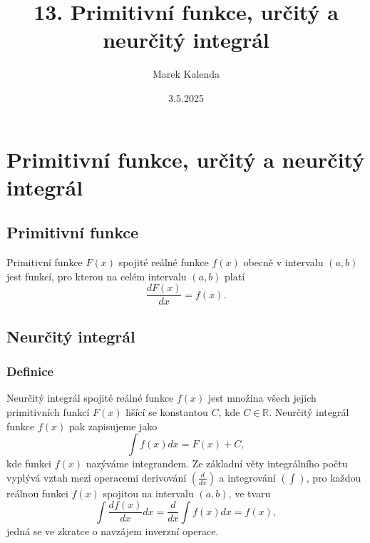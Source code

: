 \title{13. Primitivní funkce, určitý a neurčitý integrál}
\author{Marek Kalenda}
\date{3.5.2025}

\maketitle


\section{Primitivní funkce, určitý a neurčitý integrál}
\subsection{Primitivní funkce}
Primitivní funkce $F(x)$ spojité reálné funkce $f(x)$ obecně v intervalu $(a,b)$ jest funkcí, pro kterou na celém intervalu $(a,b)$ platí
$$
\frac{dF(x)}{dx} = f(x).
$$
\subsection{Neurčitý integrál}
\subsubsection{Definice}
Neurčitý integrál spojité reálné funkce $f(x)$ jest množina všech jejich primitivních funkcí $F(x)$ lišící se konstantou $C$, kde $C \in \mathbb{R}$. Neurčitý integrál funkce $f(x)$ pak zapisujeme jako
$$
\int f(x)dx = F(x) + C,
$$
kde funkci $f(x)$ nazýváme integrandem. Ze základní věty integrálního počtu vyplývá vztah mezi operacemi derivování $\left(\frac{d}{dx}\right)$ a integrování $(\int)$, pro každou reálnou funkci $f(x)$ spojitou na intervalu $(a,b)$, ve tvaru
$$
\int \frac{df(x)}{dx}dx = \frac{d}{dx}\int f(x)dx = f(x),
$$
jedná se ve zkratce o navzájem inverzní operace.

